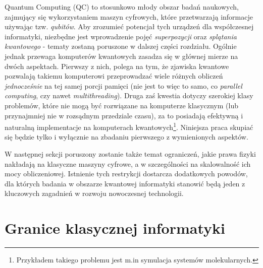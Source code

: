 \documentclass[12pt,a4paper,twoside,openany]{book}
\begin{document}
Quantum Computing (QC) to stosunkowo młody obszar badań naukowych, zajmujący się wykorzystaniem maszyn cyfrowych, które przetwarzają informacje używając tzw. \textit{qubitów}. Aby zrozumieć potencjał tych urządzeń dla współczesnej informatyki, niezbędne jest wprowadzenie pojęć \textit{superpozycji} oraz \textit{splątania kwantowego} - tematy zostaną poruszone w dalszej części rozdziału. Ogólnie jednak przewaga komputerów kwantowych zasadza się w głównej mierze na dwóch aspektach. Pierwszy z nich, polega na tym, że zjawiska kwantowe pozwalają takiemu komputerowi przeprowadzać wiele różnych obliczeń \textit{jednocześnie} na tej samej porcji pamięci (nie jest to więc to samo, co \textit{parallel computing}, czy nawet \textit{multithreading}). Druga zaś kwestia dotyczy szerokiej klasy problemów, które nie mogą być rozwiązane na komputerze klasycznym (lub przynajmniej nie w rozsądnym przedziale czasu), za to posiadają efektywną i naturalną implementacje na komputerach kwantowych\footnote{Przykładem takiego problemu jest m.in symulacja systemów molekularnych.}. Niniejsza praca skupiać się będzie tylko i wyłącznie na zbadaniu pierwszego z wymienionych aspektów.

W następnej sekcji poruszony zostanie także temat ograniczeń, jakie prawa fizyki nakładają na klasyczne maszyny cyfrowe, a w szczególności na skalowalność ich mocy obliczeniowej. Istnienie tych restrykcji dostarcza dodatkowych powodów, dla których badania w obszarze kwantowej informatyki stanowić będą jeden z kluczowych zagadnień w rozwoju nowoczesnej technologii.



\section{Granice klasycznej informatyki}
\end{document}
